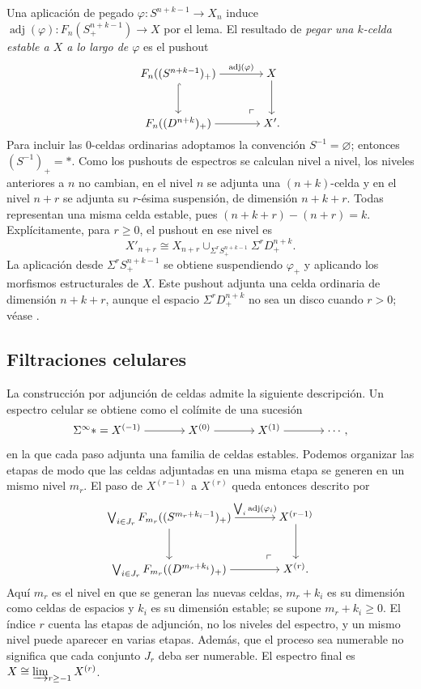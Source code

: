 Una aplicación de pegado $\varphi\colon S^{n+k-1}\to X_n$ induce $\operatorname{adj}(\varphi)\colon F_n(S^{n+k-1}_+)\to X$ por el lema. El resultado de \emph{pegar una $k$-celda estable a $X$ a lo largo de $\varphi$} es el pushout
\[
\begin{tikzcd}[cramped,column sep=large,row sep=large]
F_n((S^{n+k-1})_+)
\arrow[r,"\operatorname{adj}(\varphi)"] \arrow[d,hook]
& X \arrow[d]\\
F_n((D^{n+k})_+) \arrow[r]
& X' \arrow[ul,phantom,"\ulcorner",very near start].
\end{tikzcd}
\]
Para incluir las $0$-celdas ordinarias adoptamos la convención $S^{-1}=\varnothing$; entonces $(S^{-1})_+=*$. Como los pushouts de espectros se calculan nivel a nivel, los niveles anteriores a $n$ no cambian, en el nivel $n$ se adjunta una $(n+k)$-celda y en el nivel $n+r$ se adjunta su $r$-ésima suspensión, de dimensión $n+k+r$. Todas representan una misma celda estable, pues $(n+k+r)-(n+r)=k$. Explícitamente, para $r\ge0$, el pushout en ese nivel es
\[
X'_{n+r}\cong X_{n+r}\cup_{\Sigma^r S^{n+k-1}_+}\Sigma^rD^{n+k}_+.
\]
La aplicación desde $\Sigma^r S^{n+k-1}_+$ se obtiene suspendiendo $\varphi_+$ y aplicando los morfismos estructurales de $X$. Este pushout adjunta una celda ordinaria de dimensión $n+k+r$, aunque el espacio $\Sigma^rD^{n+k}_+$ no sea un disco cuando $r>0$; véase \cite[Definición~2.6.2.2]{malkiewich}.

\subsection{Filtraciones celulares}

La construcción por adjunción de celdas admite la siguiente descripción. Un espectro celular se obtiene como el colímite de una sucesión
\[
\begin{tikzcd}[cramped,column sep=large]
\Sigma^\infty *=X^{(-1)} \arrow[r]
& X^{(0)} \arrow[r] & X^{(1)} \arrow[r] & \cdots,
\end{tikzcd}
\]
en la que cada paso adjunta una familia de celdas estables. Podemos organizar las etapas de modo que las celdas adjuntadas en una misma etapa se generen en un mismo nivel $m_r$. El paso de $X^{(r-1)}$ a $X^{(r)}$ queda entonces descrito por
\[
\begin{tikzcd}[cramped,column sep=large,row sep=large]
\bigvee_{i\in J_r}F_{m_r}((S^{m_r+k_i-1})_+)
\arrow[r,"\bigvee_i\operatorname{adj}(\varphi_i)"] \arrow[d]
& X^{(r-1)} \arrow[d]\\
\bigvee_{i\in J_r}F_{m_r}((D^{m_r+k_i})_+) \arrow[r]
& X^{(r)} \arrow[ul,phantom,"\ulcorner",very near start].
\end{tikzcd}
\]
Aquí $m_r$ es el nivel en que se generan las nuevas celdas, $m_r+k_i$ es su dimensión como celdas de espacios y $k_i$ es su dimensión estable; se supone $m_r+k_i\ge0$. El índice $r$ cuenta las etapas de adjunción, no los niveles del espectro, y un mismo nivel puede aparecer en varias etapas. Además, que el proceso sea numerable no significa que cada conjunto $J_r$ deba ser numerable. El espectro final es $X\cong\varinjlim\nolimits_{r\ge-1}X^{(r)}$.

